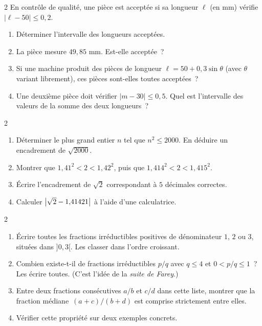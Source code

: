 \begin{probleme}{2}
En contr\^ole de qualit\'e, une pi\`ece est accept\'ee si sa longueur $\ell$ (en mm)
v\'erifie $|\ell - 50| \leq 0{,}2$.
\begin{enumerate}
  \item D\'eterminer l'intervalle des longueurs accept\'ees.
  \item La pi\`ece mesure $49{,}85$ mm. Est-elle accept\'ee~?
  \item Si une machine produit des pi\`eces de longueur $\ell = 50 + 0{,}3\sin\theta$
        (avec $\theta$ variant librement), ces pi\`eces sont-elles toutes accept\'ees~?
  \item Une deuxi\`eme pi\`ece doit v\'erifier $|m - 30| \leq 0{,}5$.
        Quel est l'intervalle des valeurs de la somme des deux longueurs~?
\end{enumerate}
\end{probleme}

\begin{probleme}{2}
\begin{enumerate}
  \item D\'eterminer le plus grand entier $n$ tel que $n^2 \leq 2000$.
        En d\'eduire un encadrement de $\sqrt{2000}$.
  \item Montrer que $1{,}41^2 < 2 < 1{,}42^2$, puis que
        $1{,}414^2 < 2 < 1{,}415^2$.
  \item \'Ecrire l'encadrement de $\sqrt{2}$ correspondant
        \`a $5$ d\'ecimales correctes.
  \item Calculer $\left|\sqrt{2} - 1{,}41421\right|$ \`a l'aide d'une calculatrice.
\end{enumerate}
\end{probleme}

\begin{probleme}{2}
\begin{enumerate}
  \item \'Ecrire toutes les fractions irr\'eductibles positives de
        d\'enominateur $1$, $2$ ou $3$, situ\'ees dans $]0, 3[$.
        Les classer dans l'ordre croissant.
  \item Combien existe-t-il de fractions irr\'eductibles $p/q$ avec
        $q \leq 4$ et $0 < p/q \leq 1$~? Les \'ecrire toutes.
        (C'est l'id\'ee de la \emph{suite de Farey}.)
  \item Entre deux fractions cons\'ecutives $a/b$ et $c/d$ dans cette
        liste, montrer que la fraction \og m\'ediane\fg\ $(a+c)/(b+d)$
        est comprise strictement entre elles.
  \item V\'erifier cette propri\'et\'e sur deux exemples concrets.
\end{enumerate}
\end{probleme}

